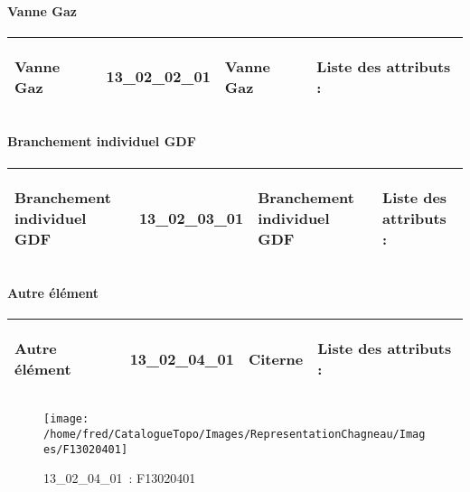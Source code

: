 \documentclass[12pt,titlepage,oneside]{book}
\begin{document}
\paragraph{Vanne Gaz}
\noindent
\vspace{\baselineskip}

\renewcommand{\arraystretch}{1.2}
\begin{supertabular}{|p{10cm}|c|p{13cm}|p{12cm}|}
 Vanne Gaz & 13\_02\_02\_01 & Vanne Gaz & Liste des attributs :
\begin{enumerate}
\end{enumerate}
\\
\hline
\end{supertabular}
\begin{figure}[h!]
  \hfill         %
\end{figure}


\paragraph{Branchement individuel GDF}
\noindent
\vspace{\baselineskip}

\renewcommand{\arraystretch}{1.2}
\begin{supertabular}{|p{10cm}|c|p{13cm}|p{12cm}|}
 Branchement individuel GDF & 13\_02\_03\_01 & Branchement individuel GDF & Liste des attributs :
\begin{enumerate}
\end{enumerate}
\\
\hline
\end{supertabular}
\begin{figure}[h!]
  \hfill         %
\end{figure}


\paragraph{Autre élément}
\noindent
\vspace{\baselineskip}

\renewcommand{\arraystretch}{1.2}
\begin{supertabular}{|p{10cm}|c|p{13cm}|p{12cm}|}
 Autre élément & 13\_02\_04\_01 & Citerne & Liste des attributs :
\begin{enumerate}
\end{enumerate}
\\
\hline
\end{supertabular}
\begin{figure}[h!]
  \hfill         %
  \begin{minipage}[t]{3cm}
    \begin{center}
      \texttt{[image: /home/fred/CatalogueTopo/Images/RepresentationChagneau/Images/F13020401]}
      \caption[~13\_02\_04\_01]{\small{13\_02\_04\_01~:} \tiny{F13020401}}\label{F13020401}
    \end{center}
  \end{minipage}
\end{figure}
\end{document}
